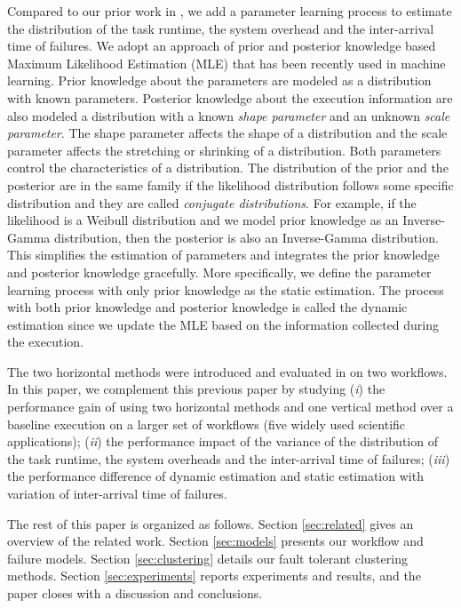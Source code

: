 \documentclass{IOS-Book-Article}
\begin{document}
Compared to our prior work in \cite{Chen2012}, we add a parameter learning process to estimate the distribution of the task runtime, the system overhead and the inter-arrival time of failures. We adopt an approach of prior and posterior knowledge based Maximum Likelihood Estimation (MLE) that has been recently used in machine learning. Prior knowledge about the parameters are modeled as a distribution with known parameters. Posterior knowledge about the execution information are also modeled a distribution with a known \emph{shape parameter} and an unknown \emph{scale parameter}. The shape parameter affects the shape of a distribution and the scale parameter affects the stretching or shrinking of a distribution. Both parameters control the characteristics of a distribution. The distribution of the prior and the posterior are in the same family if the likelihood distribution follows some specific distribution and they are called \emph{conjugate distributions}. For example, if the likelihood is a Weibull distribution and we model prior knowledge as an Inverse-Gamma distribution, then the posterior is also an Inverse-Gamma distribution. This simplifies the estimation of parameters and integrates the prior knowledge and posterior knowledge gracefully. More specifically, we define the parameter learning process with only prior knowledge as the static estimation. The process with both prior knowledge and posterior knowledge is called the dynamic estimation since we update the MLE based on the information collected during the execution.  

The two horizontal methods were introduced and evaluated in \cite{Chen2012} on two workflows. In this paper, we complement this previous paper by studying (\emph{i}) the performance gain of using two horizontal methods and one vertical method over a baseline execution on a larger set of workflows (five widely used scientific applications); (\emph{ii}) the performance impact of the variance of the distribution of the task runtime, the system overheads and the inter-arrival time of failures; (\emph{iii}) the performance difference of dynamic estimation and static estimation with variation of inter-arrival time of failures.  

The rest of this paper is organized as follows. Section \ref{sec:related} gives an overview of the related work. Section \ref{sec:models} presents our workflow and failure models. Section \ref{sec:clustering} details our fault tolerant clustering methods. Section \ref{sec:experiments} reports experiments and results, and the paper closes with a discussion and conclusions. 
\end{document}
